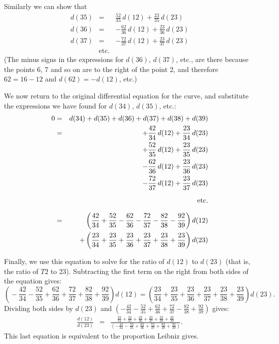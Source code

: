 \documentclass[twoside,openright]{article}
\newlength{\oldjot}
\begin{document}
 \setlength{\jot}{\oldjot}
Similarly we can show that
\setlength{\jot}{2ex}
\begin{eqnarray*}
d(35)  & = & \frac{52}{35}\,d(12) + \frac{23}{35}\,d(23) \\
d(36)  & = & -\frac{62}{36}\,d(12) + \frac{23}{36}\,d(23) \\
d(37)  & = & -\frac{72}{37}\,d(12) + \frac{23}{37}\,d(23) \\
 &\mbox{etc.} &
\end{eqnarray*}
\setlength{\jot}{\oldjot}
(The minus signs in the expressions for $d(36)$, $d(37)$, etc., are
there because the points 6, 7 and so on are to the right of the point
2, and therefore $62 = 16 - 12$ and $d(62) = -d(12)$, etc.)

We now return to the original differential equation for the curve, and
substitute the expressions we have found for $d(34)$, $d(35)$, etc.:
\setlength{\jot}{2ex}
\begin{eqnarray*}
0 & = & d(34) + d(35) + d(36) + d(37) + d(38) + d(39) \\
  & = & + \frac{42}{34}\,d(12) + \frac{23}{34}\,d(23)\\
  & &  + \frac{52}{35}\,d(12) + \frac{23}{35}\,d(23)\\
  & &  -  \frac{62}{36}\,d(12) + \frac{23}{36}\,d(23)\\
  & & -  \frac{72}{37}\,d(12) + \frac{23}{37}\,d(23)\\
  &  & \mbox{\rule[-1em]{0em}{2.4em}etc.}   \\
  & = & \left(\frac{42}{34} + \frac{52}{35}  - \frac{62}{36} - \frac{72}{37} - \frac{82}{38} - \frac{92}{39}\right)d(12)  \\
  & & + \left(\frac{23}{34} + \frac{23}{35} + \frac{23}{36} + \frac{23}{37} + \frac{23}{38} + \frac{23}{39}\right)d(23) 
  \end{eqnarray*}
  \setlength{\jot}{\oldjot}

  Finally, we use this equation to solve for the ratio of $d(12)$ to
  $d(23)$ (that is, the ratio of $T2$ to 23). Subtracting the first
  term on the right from both sides of the equation gives: {\small
    $$ \left(\!\!- \frac{42}{34} - \frac{52}{35} + \frac{62}{36} +
      \frac{72}{37} + \frac{82}{38} + \frac{92}{39}\right)d(12) =
    \left(\frac{23}{34} + \frac{23}{35} + \frac{23}{36} +
      \frac{23}{37} + \frac{23}{38} + \frac{23}{39}\right)d(23).$$}
  Dividing both sides by $d(23)$ and
  $ \left(-\frac{42}{34} - \frac{52}{35} + \frac{62}{36} +
    \frac{72}{37} - \frac{82}{38} + \frac{92}{39}\right)$ gives:
  \begin{eqnarray*}
    \frac{d(12)}{d(23)} &  = &\frac{\frac{23}{34} + \frac{23}{35} +
                               \frac{23}{36} + \frac{23}{37} +
                               \frac{23}{38} + \frac{23}{39}}{
                               \left(-\frac{42}{34} - \frac{52}{35}  +
                               \frac{62}{36} + \frac{72}{37} +
                               \frac{82}{38} + \frac{92}{39}\right)}. 
  \end{eqnarray*}
This last equation is equivalent to the proportion Leibniz gives.
\end{document}
